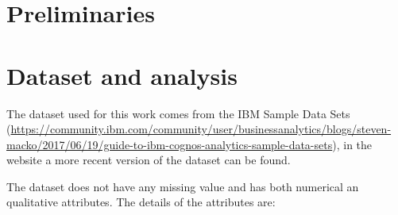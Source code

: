 \documentclass[a4paper,11pt]{article}
\begin{document}
\section{Preliminaries}

\section{Dataset and analysis}

The dataset used for this work comes from the IBM Sample Data Sets (\url{https://community.ibm.com/community/user/businessanalytics/blogs/steven-macko/2017/06/19/guide-to-ibm-cognos-analytics-sample-data-sets}), in the website a more recent version of the dataset can be found.

The dataset does not have any missing value and has both numerical an qualitative attributes. The details of the attributes are:
\end{document}
